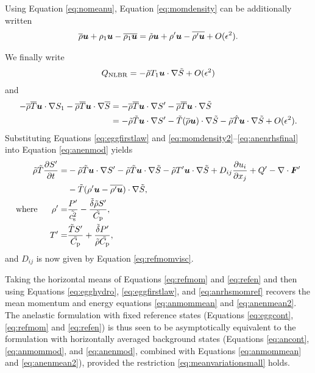 \documentclass[12pt]{article}
\newcommand{\vecf}{\bm{F}}
\begin{document}
Using Equation \eqref{eq:nomeanu}, Equation \eqref{eq:momdensity} can be additionally written
  \begin{align}\label{eq:momdensity2}
\overline{\rho}\bm{u} + \rho_1\bm{u} - \overline{\rho_1\bm{u}} = \tilde{\rho}\bm{u} + {\rho^\prime}\bm{u} - \overline{{\rho^\prime}\bm{u}} + O(\epsilon^2).
\end{align}

We finally write 
\begin{align}
	Q_{\rm NLBR} = -\tilde{\rho} T_1\bm{u}\cdot\nabla\tilde{S} + O(\epsilon^2)
\end{align}
and 
\begin{align}\label{eq:anenrhsfinal}
	-\overline{\rho}\overline{T} \bm{u}\cdot\nabla S_1 - \overline{\rho}\overline{T} \bm{u}\cdot\nabla\overline{S} &= - \overline{\rho}\overline{T}\bm{u}\cdot\nabla {S^\prime} -\overline{\rho}\overline{T}\bm{u}\cdot\nabla\tilde{S} \nonumber\\
	&=-\tilde{\rho}\tilde{T}\bm{u}\cdot\nabla {S^\prime} - \tilde{T}(\overline{\rho} \bm{u})\cdot\nabla\tilde{S} - \tilde{\rho}\hat{T}\bm{u}\cdot\nabla\tilde{S} + O(\epsilon^2).
\end{align}
Substituting Equations \eqref{eq:eggfirstlaw} and \eqref{eq:momdensity2}--\eqref{eq:anenrhsfinal} into Equation \eqref{eq:anenmod} yields
\begin{subequations}\label{eq:refen}
	\begin{align}
		\rhotilde\tmptilde\pderiv{\entrprime}{t}= &-\rhotilde\tmptilde\ugrad \entrprime - \rhotilde\tmptilde \ugrad \entrtilde - \rhotilde \tmpprime\ugrad\entrtilde+D_{ij}\pderiv{u_i}{x_j} + Q^\prime- \Div\vecf^\prime  \nonumber\\
		& - \tmptilde(\rhoprime \vecu-\overline{\rhoprime\vecu})\cdot\nabla\entrtilde,\label{eq:refenmain}\\
		\where \rhoprime =& \frac{\prsprime}{\tilde{\cs^2}}-\frac{\deltatilde \rhotilde S ^\prime}{\cptilde},\label{eq:refenrhopert}\\
		 \tmpprime = & \frac{\tmptilde \entrprime}{\cptilde} + \frac{\deltatilde  \prsprime}{\rhotilde\cptilde},\label{eq:refentmppert}
	\end{align}
\end{subequations}
and $D_{ij}$ is now given by Equation \eqref{eq:refmomvisc}. 

Taking the horizontal means of Equations \eqref{eq:refmom} and \eqref{eq:refen} and then using Equations \eqref{eq:egghydro}, \eqref{eq:eggfirstlaw}, and \eqref{eq:anrhsmomref} recovers the mean momentum and energy equations \eqref{eq:anmommean} and \eqref{eq:anenmean2}. The anelastic formulation with fixed reference states (Equations \eqref{eq:eggcont}, \eqref{eq:refmom} and \eqref{eq:refen}) is thus seen to be asymptotically equivalent to the formulation with horizontally averaged background states (Equations \eqref{eq:ancont}, \eqref{eq:anmommod}, and \eqref{eq:anenmod}, combined with Equations \eqref{eq:anmommean} and \eqref{eq:anenmean2}), provided the restriction \eqref{eq:meanvariationsmall} holds.
\end{document}
